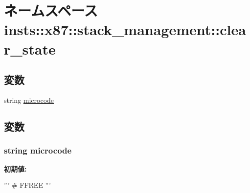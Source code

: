 \hypertarget{namespaceinsts_1_1x87_1_1stack__management_1_1clear__state}{
\section{ネームスペース insts::x87::stack\_\-management::clear\_\-state}
\label{namespaceinsts_1_1x87_1_1stack__management_1_1clear__state}
}
\subsection*{変数}
\begin{DoxyCompactItemize}
\item 
string \hyperlink{namespaceinsts_1_1x87_1_1stack__management_1_1clear__state_a770f11a173e99389a8802f0107ed8f52}{microcode}
\end{DoxyCompactItemize}


\subsection{変数}
\hypertarget{namespaceinsts_1_1x87_1_1stack__management_1_1clear__state_a770f11a173e99389a8802f0107ed8f52}{
\subsubsection[{microcode}]{\setlength{\rightskip}{0pt plus 5cm}string {\bf microcode}}}
\label{namespaceinsts_1_1x87_1_1stack__management_1_1clear__state_a770f11a173e99389a8802f0107ed8f52}
{\bfseries 初期値:}
\begin{DoxyCode}
'''
# FFREE
'''
\end{DoxyCode}
